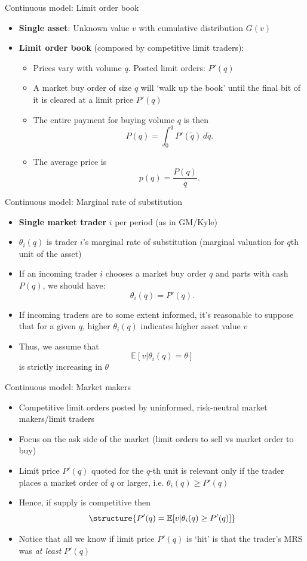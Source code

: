 \documentclass[english,10pt
,aspectratio=169
]{beamer}
\begin{document}
\begin{frame}{Continuous model: Limit order book}
\begin{itemize}
	\item \textbf{Single asset}: Unknown value $v$ with cumulative distribution  $G(v)$
	\item \textbf{Limit order book} (composed by competitive limit traders): 
	\begin{itemize}
		\item Prices vary with volume $q$. Posted limit orders: $P'(q)$
		\item A market buy order of size $q$ will `walk up the book' until the final bit of it is cleared at a limit price $P'(q)$
		\item The entire payment for buying volume $q$ is then
		\[
		P(q) = \int_0^q P'(\tilde{q}) \, d\tilde{q}.
		\]
		\item The average price is 
		\[
		p(q) = \frac{P(q)}{q}.
		\]
	\end{itemize}
\end{itemize}
\end{frame}


\begin{frame}{Continuous model: Marginal rate of substitution}
	\begin{itemize}
		\item \textbf{Single market trader} $i$ per period (as in GM/Kyle)
		\item $\theta_i(q)$ is trader $i$'s marginal rate of substitution (marginal valuation for $q$th unit of the asset)
		\item If an incoming trader $i$ chooses a market buy order $q$ and parts with cash $P(q)$, we should have: \[\theta_i(q) = P'(q).\]
		\item If incoming traders are to some extent informed, it's reasonable to suppose that for a given $q$, higher $\theta_i(q)$ indicates higher asset value $v$
		\item Thus, we assume that 
		\[
		\mathbb{E}[v|\theta_i(q) = \theta]
		\]
		is strictly increasing in $\theta$
	\end{itemize}
\end{frame}


\begin{frame}{Continuous model: Market makers}
	\begin{itemize}	
		\item Competitive limit orders posted by uninformed, risk-neutral market makers/limit traders
		\item Focus on the ask side of the market (limit orders to sell vs market order to buy)
		\item Limit price $P'(q)$ quoted for the $q$-th unit is relevant only if the trader places a market order of $q$ or larger, i.e. $\theta_i(q) \geq P'(q)$
		\item Hence, if supply is competitive then
		\[
		\structure{P'(q) = \mathbb{E}[v|\theta_i(q) \geq P'(q)]}
		\]
		\item Notice that all we know if limit price $P'(q)$ is `hit' is that the trader's MRS was \textit{at least} $P'(q)$
	\end{itemize}
\end{frame}
\end{document}
